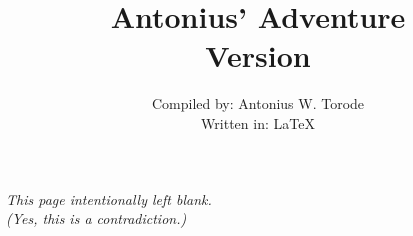 \documentclass[openany,twoside, notitlepage,letterpaper,11pt]{book}
\title{%
	Antonius' Adventure \\ Version \Version}
\date{}
\author{Compiled by: Antonius W. Torode \\ Written in: \LaTeX}
\begin{document}
\frontmatter
\maketitle
\thispagestyle{empty}
\pagestyle{empty}




\thispagestyle{empty}
\newpage
{}
\begin{center}
	\textit{This page intentionally left blank.\\ (Yes, this is a contradiction.)}
\end{center}

\tableofcontents


\setlength{\parindent}{0pt}
\mainmatter
\pagestyle{fancy}
\setlength{\parindent}{25pt}

\newpage


\newpage


\newpage


\newpage


\newpage


\newpage



\backmatter

\printindex
\end{document}
